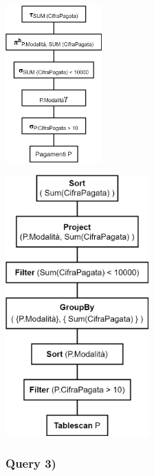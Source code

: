 \documentclass[a4paper,12pt]{article}
\begin{document}
\begin{minipage}{\textwidth}
\begin{multicols}{2}

\null \vfill
\includegraphics[height=6cm]{ Albero logico 2.png }
\vfill \null

\columnbreak

\includegraphics[height=10cm]{ Albero fisico 2.png }
\end{multicols}
\end{minipage}

 \subsubsection{ Query 3) }
\end{document}
